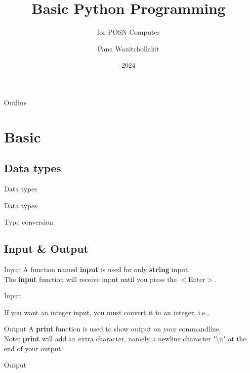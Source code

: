 \documentclass[aspectratio=43]{beamer}
\title[Basic Python]{Basic Python Programming}
\subtitle[POSN Computer]{for POSN Computer}
\author[Pana W.]{Pana Wanitchollakit}
\date{2024}
\begin{document}
\frame{\titlepage}

\begin{frame}{Outline}
\end{frame}


\section{Basic}

\subsection[Data types]{Data types}
\begin{frame}{Data types}
    \begin{block}{Data types}
        
    \end{block}
    \begin{block}{Type conversion}
        
    \end{block}
\end{frame}


\subsection[I/O]{Input \& Output}
\begin{frame}{Input}
    A function named \textbf{input} is used for only \textbf{string} input. \\
    The \textbf{input} function will receive input until you press the $<$Enter$>$.
    \begin{block}{Input}
        
        If you want an integer input, you must convert it to an integer, i.e.,
        
    \end{block}
\end{frame}

\begin{frame}{Output}
    A \textbf{print} function is used to show output on your commandline. \\
    Note: \textbf{print} will add an extra character, namely a newline character "\textbackslash n" at the end of your output.
    \begin{block}{Output}
        
    \end{block}
\end{frame}
\end{document}
